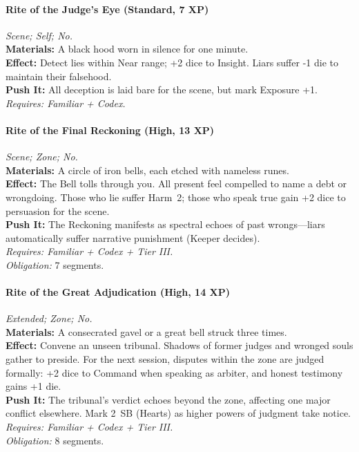 \paragraph{Rite of the Judge’s Eye (Standard, 7 XP)} \emph{Scene; Self; No.}\\
\textbf{Materials:} A black hood worn in silence for one minute.\\
\textbf{Effect:} Detect lies within Near range; +2 dice to Insight. Liars suffer -1 die to maintain their falsehood.\\
\textbf{Push It:} All deception is laid bare for the scene, but mark Exposure +1.\\
\emph{Requires: Familiar + Codex.}

\paragraph{Rite of the Final Reckoning (High, 13 XP)} \emph{Scene; Zone; No.}\\
\textbf{Materials:} A circle of iron bells, each etched with nameless runes.\\
\textbf{Effect:} The Bell tolls through you. All present feel compelled to name a debt or wrongdoing. Those who lie suffer Harm~2; those who speak true gain +2 dice to persuasion for the scene.\\
\textbf{Push It:} The Reckoning manifests as spectral echoes of past wrongs—liars automatically suffer narrative punishment (Keeper decides).\\
\emph{Requires: Familiar + Codex + Tier III.}\\
\emph{Obligation:} 7 segments.

\paragraph{Rite of the Great Adjudication (High, 14 XP)} \emph{Extended; Zone; No.}\\
\textbf{Materials:} A consecrated gavel or a great bell struck three times.\\
\textbf{Effect:} Convene an unseen tribunal. Shadows of former judges and wronged souls gather to preside. For the next session, disputes within the zone are judged formally: +2 dice to Command when speaking as arbiter, and honest testimony gains +1 die.\\
\textbf{Push It:} The tribunal’s verdict echoes beyond the zone, affecting one major conflict elsewhere. Mark 2~SB (Hearts) as higher powers of judgment take notice.\\
\emph{Requires: Familiar + Codex + Tier III.}\\
\emph{Obligation:} 8 segments.

